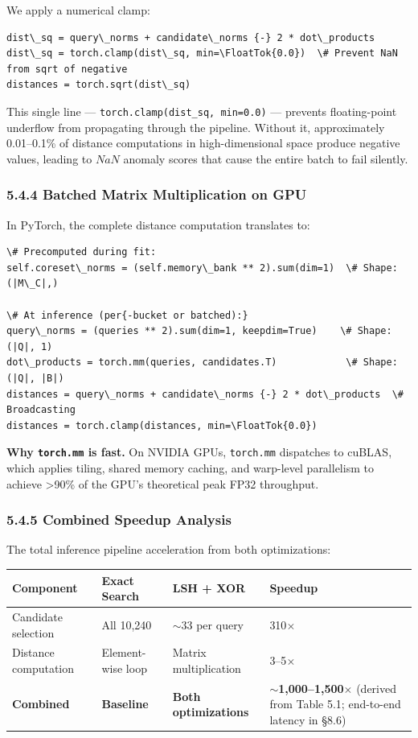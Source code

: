 \documentclass[12pt, a4paper, oneside]{report}
\begin{document}
We apply a numerical clamp:

\begin{lstlisting}
dist\_sq = query\_norms + candidate\_norms {-} 2 * dot\_products
dist\_sq = torch.clamp(dist\_sq, min=\FloatTok{0.0})  \# Prevent NaN from sqrt of negative
distances = torch.sqrt(dist\_sq)
\end{lstlisting}

This single line --- \texttt{torch.clamp(dist\_sq,\ min=0.0)} --- prevents floating-point underflow from propagating through the pipeline. Without it, approximately 0.01--0.1\% of distance computations in high-dimensional space produce negative values, leading to \(NaN\) anomaly scores that cause the entire batch to fail silently.

\subsubsection{5.4.4 Batched Matrix Multiplication on GPU}\label{batched-matrix-multiplication-on-gpu}

In PyTorch, the complete distance computation translates to:

\begin{lstlisting}
\# Precomputed during fit:
self.coreset\_norms = (self.memory\_bank ** 2).sum(dim=1)  \# Shape: (|M\_C|,)

\# At inference (per{-bucket or batched):}
query\_norms = (queries ** 2).sum(dim=1, keepdim=True)    \# Shape: (|Q|, 1)
dot\_products = torch.mm(queries, candidates.T)            \# Shape: (|Q|, |B|)
distances = query\_norms + candidate\_norms {-} 2 * dot\_products  \# Broadcasting
distances = torch.clamp(distances, min=\FloatTok{0.0})
\end{lstlisting}

\textbf{Why \texttt{torch.mm} is fast.} On NVIDIA GPUs, \texttt{torch.mm} dispatches to cuBLAS, which applies tiling, shared memory caching, and warp-level parallelism to achieve \textgreater90\% of the GPU's theoretical peak FP32 throughput.

\subsubsection{5.4.5 Combined Speedup Analysis}\label{combined-speedup-analysis}

The total inference pipeline acceleration from both optimizations:

{\def\LTcaptype{none} %
\begin{longtable}[]{@{}llll@{}}
\toprule\noalign{}
Component & Exact Search & LSH + XOR & Speedup \\
\midrule\noalign{}
\endhead
\bottomrule\noalign{}
\endlastfoot
Candidate selection & All 10,240 & ${\sim}$33 per query & 310$\times$ \\
Distance computation & Element-wise loop & Matrix multiplication & 3--5$\times$ \\
\textbf{Combined} & \textbf{Baseline} & \textbf{Both optimizations} & \textbf{${\sim}$1,000--1,500$\times$} (derived from Table 5.1; end-to-end latency in §8.6) \\
\end{longtable}
}
\end{document}

